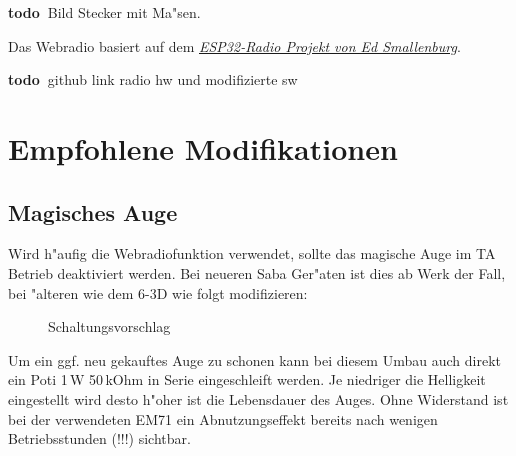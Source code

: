 \documentclass[ngerman,11pt,parskip=half] {scrartcl}
\newcommand {\todo} {\textbf{\color{red} todo\ }}
\begin{document}
\todo Bild Stecker mit Ma"sen.

Das Webradio basiert auf dem \emph{\href{https://github.com/Edzelf/ESP32-Radio}{ESP32-Radio Projekt von Ed Smallenburg}}.

\todo github link radio hw und modifizierte sw


\section{Empfohlene Modifikationen} \label{sec:mod}

\subsection{Magisches Auge} \label{sec:mod:magischesauge}

Wird h"aufig die Webradiofunktion verwendet, sollte das magische Auge im TA Betrieb deaktiviert werden. Bei neueren Saba Ger"aten ist dies ab Werk der Fall, bei "alteren wie dem 6-3D wie folgt modifizieren:

\begin{figure}[H]
\centering
{}
\caption{Schaltungsvorschlag} \label{fig:1}
\end{figure}

Um ein ggf. neu gekauftes Auge zu schonen kann bei diesem Umbau auch direkt ein Poti 1\,W 50\,kOhm in Serie eingeschleift werden. Je niedriger die Helligkeit eingestellt wird desto h"oher ist die Lebensdauer des Auges. Ohne Widerstand ist bei der verwendeten EM71 ein Abnutzungseffekt bereits nach wenigen Betriebsstunden (!!!) sichtbar.
\end{document}
